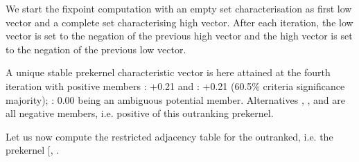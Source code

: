 \documentclass[a4paper,12pt,english]{sphinxhowto}
\begin{document}
\sphinxAtStartPar
We start the fixpoint computation with an empty set characterisation as first low vector and a complete set  characterising high vector. After each iteration, the low vector is set to the negation of the previous high vector and the high vector is set to the negation of the previous low vector.

\sphinxAtStartPar
A unique stable prekernel characteristic vector  is here attained at the fourth iteration with positive members : +0.21 and : +0.21 (60.5\% criteria significance majority); : 0.00 being an ambiguous potential member. Alternatives , ,  and  are all negative members, i.e. positive  of this outranking prekernel.

\sphinxAtStartPar
Let us now compute the restricted adjacency table for the outranked, i.e. the  prekernel {[}, \sphinxstyleemphasis{a7}{]}.

\begin{sphinxVerbatim}[commandchars=\\\{\},numbers=left,firstnumber=1,stepnumber=1]
  \PYG{p}{[}\PYG{p}{]}
        \PYG{p}{[}\PYG{p}{]}
        
        
\end{sphinxVerbatim}
\end{document}
